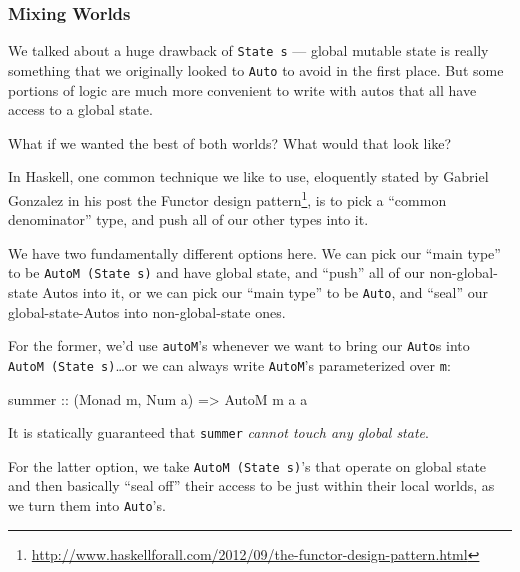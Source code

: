 \documentclass[]{article}
\newenvironment{Shaded}{}{}
\newcommand{\DataTypeTok}[1]{\textcolor[rgb]{0.56,0.13,0.00}{#1}}
\newcommand{\NormalTok}[1]{#1}
\newcommand{\OtherTok}[1]{\textcolor[rgb]{0.00,0.44,0.13}{#1}}
\renewcommand{\href}[2]{#2\footnote{\url{#1}}}
\begin{document}
\subsubsection{Mixing Worlds}\label{mixing-worlds}

We talked about a huge drawback of \texttt{State\ s} --- global mutable state is
really something that we originally looked to \texttt{Auto} to avoid in the
first place. But some portions of logic are much more convenient to write with
autos that all have access to a global state.

What if we wanted the best of both worlds? What would that look like?

In Haskell, one common technique we like to use, eloquently stated by Gabriel
Gonzalez in his post
\href{http://www.haskellforall.com/2012/09/the-functor-design-pattern.html}{the
Functor design pattern}, is to pick a ``common denominator'' type, and push all
of our other types into it.

We have two fundamentally different options here. We can pick our ``main type''
to be \texttt{AutoM\ (State\ s)} and have global state, and ``push'' all of our
non-global-state Autos into it, or we can pick our ``main type'' to be
\texttt{Auto}, and ``seal'' our global-state-Autos into non-global-state ones.

For the former, we'd use \texttt{autoM}'s whenever we want to bring our
\texttt{Auto}s into \texttt{AutoM\ (State\ s)}\ldots or we can always write
\texttt{AutoM}'s parameterized over \texttt{m}:

\begin{Shaded}
\begin{Highlighting}[]
\OtherTok{summer ::}\NormalTok{ (}\DataTypeTok{Monad}\NormalTok{ m, }\DataTypeTok{Num}\NormalTok{ a) }\OtherTok{=\textgreater{}} \DataTypeTok{AutoM}\NormalTok{ m a a}
\end{Highlighting}
\end{Shaded}

It is statically guaranteed that \texttt{summer} \emph{cannot touch any global
state}.

For the latter option, we take \texttt{AutoM\ (State\ s)}'s that operate on
global state and then basically ``seal off'' their access to be just within
their local worlds, as we turn them into \texttt{Auto}'s.
\end{document}
